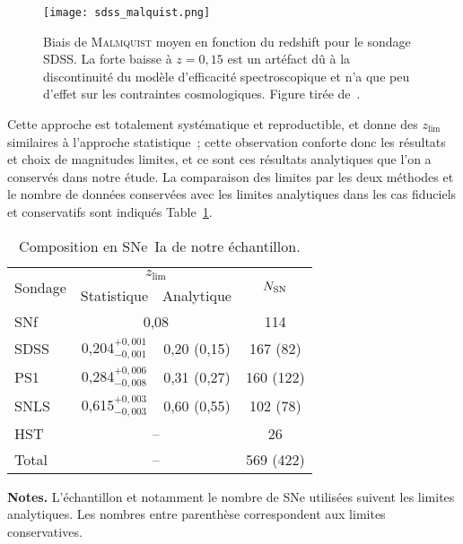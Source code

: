 \documentclass[../main/main.tex]{subfiles}
\begin{document}
\begin{SCfigure}[0.7]
    \centering
    \texttt{[image: sdss\_malquist.png]}
    \caption[Biais de \textsc{Malmquist} moyen en fonction du redshift pour le
    sondage SDSS.]{Biais de \textsc{Malmquist} moyen en fonction du redshift
        pour le sondage SDSS. La forte baisse à $z=0,15$ est un artéfact dû à la
        discontinuité du modèle d'efficacité spectroscopique et n'a que peu
        d'effet sur les contraintes cosmologiques. Figure tirée
    de~\cite{conley2011}.}
    \label{fig:sdssmalm}
\end{SCfigure}

Cette approche est totalement systématique et reproductible, et donne des
$z_{\lim}$ similaires à l'approche statistique~; cette observation conforte donc
les résultats et choix de magnitudes limites, et ce sont ces résultats
analytiques que l'on a conservés dans notre étude. La comparaison des limites
par les deux méthodes et le nombre de données conservées avec les limites
analytiques dans les cas fiduciels et conservatifs sont indiqués
Table~\ref{tab:zlimsample}.

\begin{table}[ht]
    \centering
    \begin{threeparttable}
        \caption{Composition en SNe~Ia de notre échantillon.}
        \label{tab:zlimsample}
        \begin{tabular}{lccc}
            \toprule
            \multirow{2}[2]{*}{Sondage} &
            \multicolumn{2}{c}{$z_{\lim}$} &
            \multirow{2}[2]{*}{$N_{\rm SN}$}\\
            \cmidrule(lr){2-3}
            & Statistique & Analytique & \\
            \midrule
            SNf &
            \multicolumn{2}{c}{0,08} &
            114 \\
            SDSS & 
            0,204$^{+0,001}_{-0,001}$ & 0,20 (0,15) &
            167 (82) \\
            PS1 &
            0,284$^{+0,006}_{-0,008}$ & 0,31 (0,27) &
            160 (122) \\
            SNLS &
            0,615$^{+0,003}_{-0,003}$ & 0,60 (0,55) &
            102 (78) \\
            HST &
            \multicolumn{2}{c}{--} &
            26 \\
            \midrule
            Total & \multicolumn{2}{c}{--} &
            569 (422)\\
            \bottomrule
        \end{tabular}
        \begin{tablenotes}[flushleft]
        \item \textbf{\hspace{-3,2pt}Notes.} L'échantillon et notamment le
            nombre de SNe utilisées suivent les limites analytiques. Les nombres
            entre parenthèse correspondent aux limites conservatives.
        \end{tablenotes}
    \end{threeparttable}
\end{table}
\end{document}
